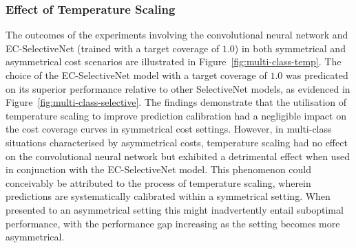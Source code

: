 \subsubsection{Effect of Temperature Scaling}
The outcomes of the experiments involving the convolutional neural network and EC-SelectiveNet (trained with a target coverage of $1.0$) in both symmetrical and asymmetrical cost scenarios are illustrated in Figure~\ref{fig:multi-class-temp}. The choice of the EC-SelectiveNet model with a target coverage of $1.0$ was predicated on its superior performance relative to other SelectiveNet models, as evidenced in Figure~\ref{fig:multi-class-selective}. The findings demonstrate that the utilisation of temperature scaling to improve prediction calibration had a negligible impact on the cost coverage curves in symmetrical cost settings. However, in multi-class situations characterised by asymmetrical costs, temperature scaling had no effect on the convolutional neural network but exhibited a detrimental effect when used in conjunction with the EC-SelectiveNet model. This phenomenon could conceivably be attributed to the process of temperature scaling, wherein predictions are systematically calibrated within a symmetrical setting. When presented to an asymmetrical setting this might inadvertently entail suboptimal performance, with the performance gap increasing as the setting becomes more asymmetrical.

